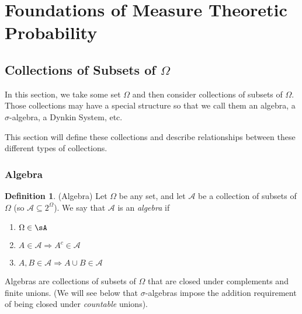 \documentclass[12pt]{article}
\theoremstyle{plain}
\theoremstyle{definition}
\newtheorem{defn}[thm]{Definition}
\theoremstyle{remark}
\begin{document}



\clearpage
\section{Foundations of Measure Theoretic Probability}


\subsection{Collections of Subsets of $\Omega$}

In this section, we take some set $\Omega$ and then consider collections
of subsets of $\Omega$. Those collections may have a special structure
so that we call them an algebra, a $\sigma$-algebra, a Dynkin System,
etc.

This section will define these collections and describe relationships
between these different types of collections.

\subsubsection{Algebra}

\begin{defn}
\label{algebra}
(Algebra)
Let $\Omega$ be any set, and let $\mathscr{A}$ be a collection of subsets of
$\Omega$ (so $\mathscr{A}\subseteq2^\Omega$). We say that
$\mathscr{A}$ is an \emph{algebra} if
\begin{enumerate}
  \item $\Omega\in\sA$
  \item $A\in\mathscr{A}\Rightarrow A^c\in\mathscr{A}$
  \item $A,B\in\mathscr{A} \Rightarrow A\cup B\in\mathscr{A}$
\end{enumerate}
Algebras are collections of subsets of $\Omega$ that are closed
under complements and finite unions. (We will see below that
$\sigma$-algebras impose the addition requirement of being closed under
\emph{countable} unions).
\end{defn}
\end{document}
